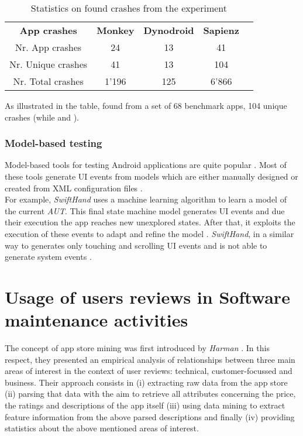 \begin{table}[tb]
\centering
\caption{Statistics on found crashes from the \sapienz experiment}
\label{tbl: sapienzresults}
\begin{tabular}{|c|c|c|c|l}
\cline{1-4}
\textbf{App crashes} & \textbf{Monkey} & \textbf{Dynodroid} & \textbf{Sapienz} &  \\ \cline{1-4}
Nr. App crashes      & 24              & 13                 & 41               &  \\ \cline{1-4}
Nr. Unique crashes   & 41              & 13                 & 104              &  \\ \cline{1-4}
Nr. Total crashes    & 1'196           & 125                & 6'866             &  \\ \cline{1-4}
\end{tabular}
\end{table}
As illustrated in the table, \sapienz found from a set of 68 benchmark apps, 104 unique crashes (while  and ).

\subsubsection{Model-based testing}
Model-based tools for testing Android applications are quite popular \cite{sapienz}. Most of these tools \cite{mobiguitar, mining, guiripper,swift} generate UI events from models which are either manually designed or created from XML configuration files \cite{sapienz}. \\
For example, \textit{SwiftHand} \cite{swift} uses a machine learning algorithm to learn a model of the current \textit{AUT}. This final state machine model \cite{areWeThereYet} generates UI events and due their execution the app reaches new unexplored states. After that, it exploits the execution of these events to adapt and refine the model \cite{swift}. \textit{SwiftHand}, in a similar way to \monkey generates only touching and scrolling UI events and is not able to generate system events \cite{areWeThereYet}.

\section{Usage of users reviews in Software maintenance activities}
\label{section:review_usage}
The concept of app store mining was first introduced by \textit{Harman} \etal
\cite{appstoremining}. In this respect, they presented an empirical analysis of relationships between three main areas of interest in the context of user reviews: technical, customer-focussed and business. 
Their approach consists in (i) extracting raw data from the app store (ii) parsing that data with the aim to retrieve all attributes concerning the price, the ratings and descriptions of the app itself (iii) using data mining to extract feature information from the above parsed descriptions and finally (iv) providing statistics about the above mentioned areas of interest.  

